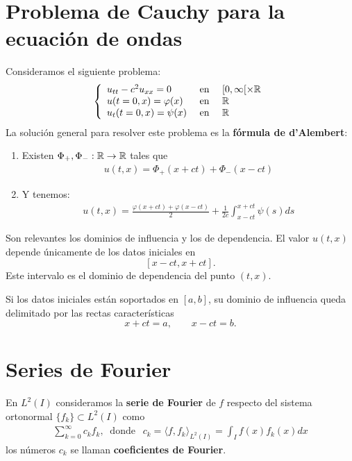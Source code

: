 \documentclass[12pt]{book}
\begin{document}
    \section{Problema de Cauchy para la ecuación de ondas}
    Consideramos el siguiente problema:
    \begin{gather*}
        \left\{
            \begin{array}{l c l}
                u_{tt} - c^2u_{xx} = 0 & \text{ en } & [0,\infty[\times \mathbb{R}\\
                u(t=0, x) = \varphi(x) & \text{ en } & \mathbb{R}\\
                u_t(t=0, x) = \psi(x) & \text{ en } & \mathbb{R}
            \end{array}
        \right.
    \end{gather*}
    La solución general para resolver este problema es la \textbf{fórmula de d'Alembert}:
    \begin{enumerate}
        \item Existen $\Phi_+, \Phi_-:\mathbb{R} \to \mathbb{R}$ tales que 
        \begin{gather*}
            u(t,x) = \Phi_+(x+ct) + \Phi_-(x-ct)
        \end{gather*}
        \item Y tenemos:
        \begin{gather*}
            \boxed{u(t,x) = \frac{\varphi(x+ct) + \varphi(x-ct)}{2} + \frac{1}{2c} \int_{x-ct}^{x+ct} \psi(s) ds}
        \end{gather*}
    \end{enumerate}
    Son relevantes los dominios de influencia y los de dependencia. El valor \(u(t,x)\) depende únicamente de los datos iniciales en
    \[
    [x-ct,x+ct].
    \]
    Este intervalo es el dominio de dependencia del punto \((t,x)\).

    Si los datos iniciales están soportados en \([a,b]\), su dominio de influencia queda delimitado por las rectas características
    \[
    x+ct=a,\qquad x-ct=b.
    \]

    \section{Series de Fourier}
    \begin{definicion}
        En $L^2(I)$ consideramos la \textbf{serie de Fourier} de $f$ respecto del sistema ortonormal $\{f_k\}\subset L^2(I)$ como 
        \begin{gather*}
            \sum_{k=0}^{\infty} c_k f_k, \ \text{ donde }\ \ c_k = \langle f, f_k \rangle_{L^2(I)} = \int_I f(x)f_k(x)dx
        \end{gather*}
        los números $c_k$ se llaman \textbf{coeficientes de Fourier}.
    \end{definicion}
\end{document}
